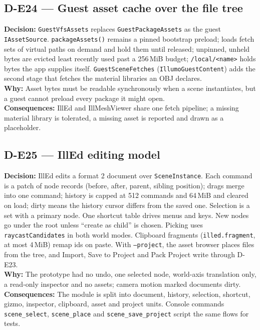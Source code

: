 \subsection*{D-E24 --- Guest asset cache over the file tree}
\begin{decisionbox}[title={D-E24 \quad 2026-09-23}]
\textbf{Decision:} \texttt{GuestVfsAssets} replaces \texttt{GuestPackageAssets}
as the guest \texttt{IAssetSource}. \texttt{packageAssets()} remains a pinned
bootstrap preload; loads fetch sets of virtual paths on demand and hold them
until released; unpinned, unheld bytes are evicted least recently used past a
256\,MiB budget; \texttt{/local/<name>} holds bytes the app supplies itself.
\texttt{GuestSceneFetches} (\texttt{IllumoGuestContent}) adds the second stage
that fetches the material libraries an OBJ declares.\\
\textbf{Why:} Asset bytes must be readable synchronously when a scene
instantiates, but a guest cannot preload every package it might open.\\
\textbf{Consequences:} IllEd and IllMeshViewer share one fetch pipeline; a
missing material library is tolerated, a missing asset is reported and drawn
as a placeholder.
\end{decisionbox}

\subsection*{D-E25 --- IllEd editing model}
\begin{decisionbox}[title={D-E25 \quad 2026-09-23}]
\textbf{Decision:} IllEd edits a format 2 document over \texttt{SceneInstance}.
Each command is a patch of node records (before, after, parent, sibling
position); drags merge into one command; history is capped at 512 commands
and 64\,MiB and cleared on load; dirty means the history cursor differs from
the saved one. Selection is a set with a primary node. One shortcut table
drives menus and keys. New nodes go under the root unless ``create as child''
is chosen. Picking uses \texttt{raycastCandidates} in both world modes.
Clipboard fragments (\texttt{illed.fragment}, at most 4\,MiB) remap ids on
paste. With \texttt{--project}, the asset browser places files from the tree,
and Import, Save to Project and Pack Project write through D-E23.\\
\textbf{Why:} The prototype had no undo, one selected node, world-axis
translation only, a read-only inspector and no assets; camera motion marked
documents dirty.\\
\textbf{Consequences:} The module is split into document, history, selection,
shortcut, gizmo, inspector, clipboard, asset and project units. Console
commands \texttt{scene\_select}, \texttt{scene\_place} and
\texttt{scene\_save\_project} script the same flows for tests.
\end{decisionbox}

